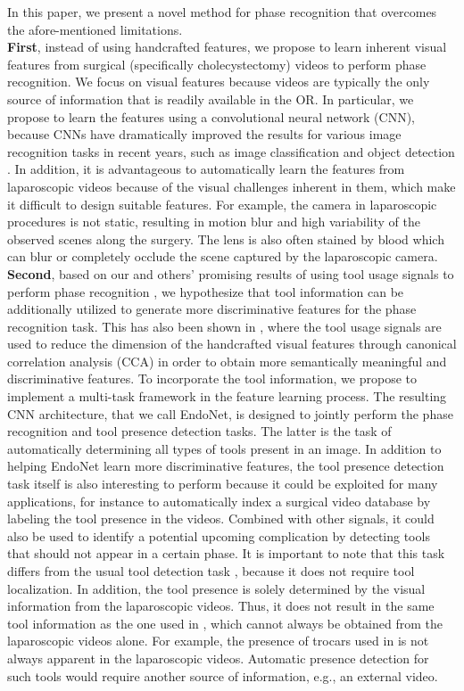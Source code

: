 \documentclass[journal]{IEEEtran} \usepackage{amssymb}
\begin{document}
In this paper, we present a novel method for phase recognition that overcomes the afore-mentioned limitations.\\
\textbf{First}, instead of
using handcrafted features, we propose to learn inherent visual features from surgical (specifically cholecystectomy) videos
to perform phase recognition. We focus on visual features because videos
are typically the only source of information that is readily available
in the OR. In particular, we propose to learn the features using a convolutional neural
network (CNN), because CNNs have dramatically improved the results for various image recognition tasks in recent years, such
as image classification \cite{krizhevsky_nips2012} and object detection
\cite{girshick_cvpr2014}. In addition, it is advantageous to automatically
learn the features from laparoscopic videos because of the visual
challenges inherent in them, which make it difficult to design suitable features.
For example, the camera in laparoscopic procedures
is not static, resulting in motion blur and high variability of
the observed scenes along the surgery. The lens is also often stained
by blood which can blur or completely occlude  the scene captured by
the laparoscopic camera. \\
\textbf{Second}, based on our and others' promising results of
 using tool usage signals to perform phase recognition \cite{stauder_ipcai2014,padoy_mia2012},
we hypothesize that tool information can be additionally utilized to generate
more discriminative features for the phase recognition task. This has also been shown in \cite{blum_miccai2010}, where the tool usage signals are used to reduce the dimension of the handcrafted visual features through canonical correlation analysis (CCA) in order to obtain more semantically meaningful and discriminative features. To incorporate the tool information,
we propose to implement a multi-task framework in the feature learning process. 
The resulting CNN architecture, that we call EndoNet, is designed to jointly perform  
the phase recognition and tool presence detection
tasks. The latter is the task of automatically determining all types
of  tools present in an image. 
In addition to helping EndoNet 
learn more discriminative features, the tool presence detection task itself is also interesting to perform because it could 
be exploited for many applications, for instance to automatically index a surgical video database by  
labeling the tool presence in the videos. Combined with other signals, it could also 
be used to identify a potential upcoming complication 
by detecting tools that should not appear in a certain phase. 
It is important to note that this
task differs from the usual tool detection task \cite{sznitman_miccai2014}, 
because it does not require tool localization. In
addition, the tool presence is solely determined by the visual information
from the laparoscopic videos. Thus, it does not result in the same tool information as the one
used in \cite{padoy_mia2012}, which cannot always be obtained
from the laparoscopic videos alone. For example, the presence of trocars used in \cite{padoy_mia2012}
is not always apparent in the laparoscopic videos. Automatic presence detection for such tools would require another source of information, e.g., an external video. 
\end{document}

